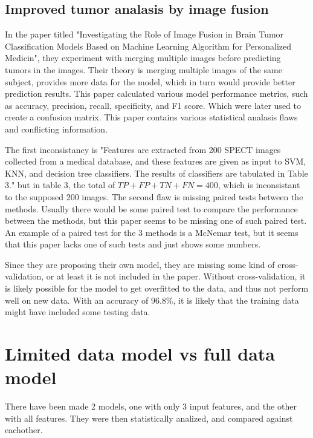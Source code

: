 \documentclass[12pt]{article}
\begin{document}
\newpage
\subsection{Improved tumor analasis by image fusion}
In the paper titled "Investigating the Role of Image Fusion in Brain Tumor Classification Models Based on Machine Learning Algorithm for Personalized Medicin"\cite{Namn2022},
they experiment with merging multiple images before predicting tumors in the images.
Their theory is merging multiple images of the same subject, provides more data for the model, which in turn would provide better prediction results.
This paper calculated various model performance metrics, such as accuracy, precision, recall, specificity, and F1 score.
Which were later used to create a confusion matrix.
This paper contains various statistical analasis flaws and conflicting information.

The first inconsistancy is "Features are extracted from 200 SPECT images collected from a medical database, and these features are given as input to SVM, KNN, and decision tree classifiers. The results of classifiers are tabulated in Table 3."
but in table 3, the total of $TP + FP + TN + FN = 400$, which is inconsistant to the supposed 200 images.
The second flaw is missing paired tests between the methods.
Usually there would be some paired test to compare the performance between the methods,
but this paper seems to be missing one of such paired test.
An example of a paired test for the 3 methods is a McNemar test,
but it seems that this paper lacks one of such tests and just shows some numbers.

Since they are proposing their own model, they are missing some kind of cross-validation, or at least it is not included in the paper.
Without cross-validation, it is likely possible for the model to get overfitted to the data, and thus not perform well on new data.
With an accuracy of $96.8\%$, it is likely that the training data might have included some testing data.

\newpage
\section{Limited data model vs full data model}
There have been made 2 models, one with only 3 input features, and the other with all features.
They were then statistically analized, and compared against eachother.
\end{document}
